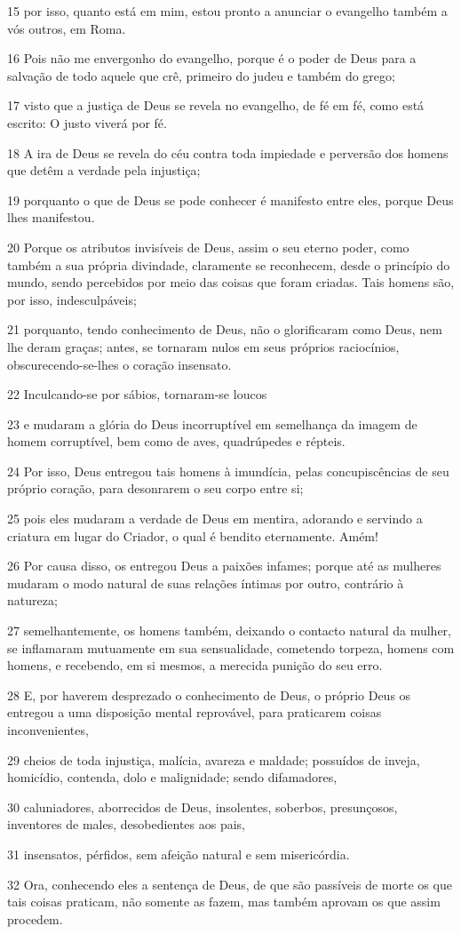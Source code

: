 \par 15 por isso, quanto está em mim, estou pronto a anunciar o evangelho também a vós outros, em Roma.
\par 16 Pois não me envergonho do evangelho, porque é o poder de Deus para a salvação de todo aquele que crê, primeiro do judeu e também do grego;
\par 17 visto que a justiça de Deus se revela no evangelho, de fé em fé, como está escrito: O justo viverá por fé.
\par 18 A ira de Deus se revela do céu contra toda impiedade e perversão dos homens que detêm a verdade pela injustiça;
\par 19 porquanto o que de Deus se pode conhecer é manifesto entre eles, porque Deus lhes manifestou.
\par 20 Porque os atributos invisíveis de Deus, assim o seu eterno poder, como também a sua própria divindade, claramente se reconhecem, desde o princípio do mundo, sendo percebidos por meio das coisas que foram criadas. Tais homens são, por isso, indesculpáveis;
\par 21 porquanto, tendo conhecimento de Deus, não o glorificaram como Deus, nem lhe deram graças; antes, se tornaram nulos em seus próprios raciocínios, obscurecendo-se-lhes o coração insensato.
\par 22 Inculcando-se por sábios, tornaram-se loucos
\par 23 e mudaram a glória do Deus incorruptível em semelhança da imagem de homem corruptível, bem como de aves, quadrúpedes e répteis.
\par 24 Por isso, Deus entregou tais homens à imundícia, pelas concupiscências de seu próprio coração, para desonrarem o seu corpo entre si;
\par 25 pois eles mudaram a verdade de Deus em mentira, adorando e servindo a criatura em lugar do Criador, o qual é bendito eternamente. Amém!
\par 26 Por causa disso, os entregou Deus a paixões infames; porque até as mulheres mudaram o modo natural de suas relações íntimas por outro, contrário à natureza;
\par 27 semelhantemente, os homens também, deixando o contacto natural da mulher, se inflamaram mutuamente em sua sensualidade, cometendo torpeza, homens com homens, e recebendo, em si mesmos, a merecida punição do seu erro.
\par 28 E, por haverem desprezado o conhecimento de Deus, o próprio Deus os entregou a uma disposição mental reprovável, para praticarem coisas inconvenientes,
\par 29 cheios de toda injustiça, malícia, avareza e maldade; possuídos de inveja, homicídio, contenda, dolo e malignidade; sendo difamadores,
\par 30 caluniadores, aborrecidos de Deus, insolentes, soberbos, presunçosos, inventores de males, desobedientes aos pais,
\par 31 insensatos, pérfidos, sem afeição natural e sem misericórdia.
\par 32 Ora, conhecendo eles a sentença de Deus, de que são passíveis de morte os que tais coisas praticam, não somente as fazem, mas também aprovam os que assim procedem.

